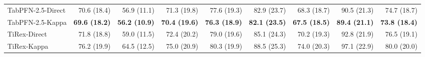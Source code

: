 \documentclass[number, 3p, 10pt, times]{elsarticle}
\begin{document}
\begin{table}[!ht]
\begin{tabular}{lrrrrrrrr}
TabPFN-2.5-Direct & 70.6 (18.4) & 56.9 (11.1) & 71.3 (19.8) & 77.6 (19.3) & 82.9 (23.7) & 68.3 (18.7) & 90.5 (21.3) & 74.7 (18.7) \\
TabPFN-2.5-Kappa & \textbf{69.6 (18.2)} & \textbf{56.2 (10.9)} & \textbf{70.4 (19.6)} & \textbf{76.3 (18.9)} & \textbf{82.1 (23.5)} & \textbf{67.5 (18.5)} & \textbf{89.4 (21.1)} & \textbf{73.8 (18.4)} \\
TiRex-Direct & 71.8 (18.8) & 59.0 (11.5) & 72.4 (20.2) & 79.0 (19.6) & 85.1 (24.3) & 70.2 (19.3) & 92.8 (21.9) & 76.5 (19.1) \\
TiRex-Kappa & 76.2 (19.9) & 64.5 (12.5) & 75.0 (20.9) & 80.3 (19.9) & 88.5 (25.3) & 74.0 (20.3) & 97.1 (22.9) & 80.0 (20.0) \\
\bottomrule
\end{tabular}
\end{table}
\end{document}
